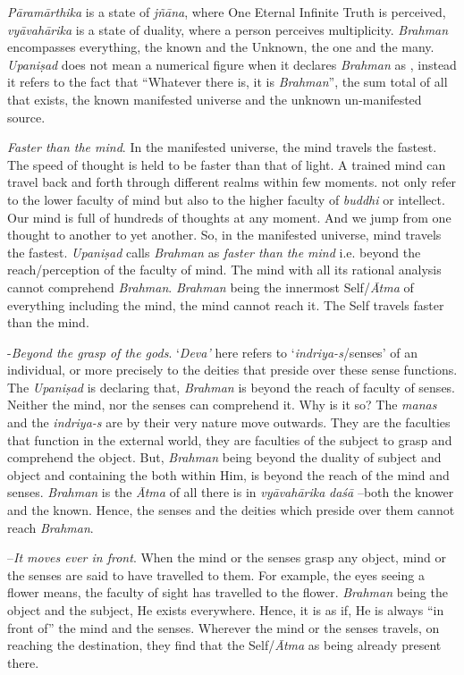\emph{Pāramārthika} is a state of \emph{jñāna}, where One Eternal Infinite Truth is perceived, \emph{vyāvahārika} is a state of duality, where a person perceives multiplicity. \emph{Brahman} encompasses everything, the known and the Unknown, the one and the many. \emph{Upaniṣad} does not mean a numerical figure when it declares \emph{Brahman} as , instead it refers to the fact that ``Whatever there is, it is \emph{Brahman}'', the sum total of all that exists, the known manifested universe and the unknown un-manifested source.

 \emph{Faster than the mind}. In the manifested universe, the mind travels the fastest. The speed of thought is held to be faster than that of light. A trained mind can travel back and forth through different realms within few moments.  not only refer to the lower faculty of mind but also to the higher faculty of \emph{buddhi} or intellect. Our mind is full of hundreds of thoughts at any moment. And we jump from one thought to another to yet another. So, in the manifested universe, mind travels the fastest. \emph{Upaniṣad} calls \emph{Brahman} as \emph{faster than the mind} i.e. beyond the reach/perception of the faculty of mind. The mind with all its rational analysis cannot comprehend \emph{Brahman}. \emph{Brahman} being the innermost Self/\emph{Ātma} of everything including the mind, the mind cannot reach it. The Self travels faster than the mind.

 -\emph{Beyond the grasp of the gods}. `\emph{Deva'} here refers to `\emph{indriya-s}/senses' of an individual, or more precisely to the deities that preside over these sense functions. The \emph{Upaniṣad} is declaring that, \emph{Brahman} is beyond the reach of faculty of senses. Neither the mind, nor the senses can comprehend it. Why is it so? The \emph{manas} and the \emph{indriya-s} are by their very nature move outwards. They are the faculties that function in the external world, they are faculties of the subject to grasp and comprehend the object. But, \emph{Brahman} being beyond the duality of subject and object and containing the both within Him, is beyond the reach of the mind and senses. \emph{Brahman} is the \emph{Ātma} of all there is in \emph{vyāvahārika} \emph{daśā} --both the knower and the known. Hence, the senses and the deities which preside over them cannot reach \emph{Brahman}.

 --\emph{It moves ever in front}. When the mind or the senses grasp any object, mind or the senses are said to have travelled to them. For example, the eyes seeing a flower means, the faculty of sight has travelled to the flower. \emph{Brahman} being the object and the subject, He exists everywhere. Hence, it is as if, He is always ``in front of'' the mind and the senses. Wherever the mind or the senses travels, on reaching the destination, they find that the Self/\emph{Ātma} as being already present there.

